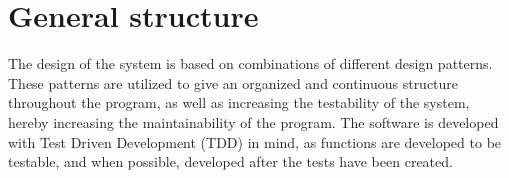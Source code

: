 \section{General structure}
The design of the system is based on combinations of different design patterns. These patterns are utilized to give an organized and continuous structure throughout the program, as well as increasing the testability of the system, hereby increasing the maintainability of the program. The software is developed with Test Driven Development (TDD) in mind, as functions are developed to be testable, and when possible, developed after the tests have been created.